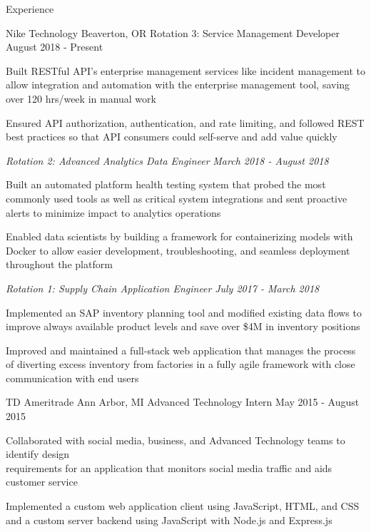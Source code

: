 \documentclass{resume}
\begin{document}
\begin{rSection}{Experience}

\begin{rSubsection}{Nike Technology}
                   {Beaverton, OR}
                   {Rotation 3: Service Management Developer}
                   {August 2018 - Present}
    \item Built RESTful API's enterprise management services like incident management
          to allow integration and automation with the enterprise management tool, saving
          over 120 hrs/week in manual work
    \item Ensured API authorization, authentication, and rate limiting, and followed REST best practices
          so that API consumers could self-serve and add value quickly

    \vspace{-1mm}
    {\em Rotation 2: Advanced Analytics Data Engineer} \hfill {\em March 2018 -  August 2018}
    \item Built an automated platform health testing system that probed the most
          commonly used tools as well as critical system integrations and sent
          proactive alerts to minimize impact to analytics operations
    \item Enabled data scientists by building a framework for containerizing models
          with Docker to allow easier development, troubleshooting, and seamless deployment
          throughout the platform

    \vspace{-1mm}
    {\em Rotation 1: Supply Chain Application Engineer} \hfill {\em July 2017 - March 2018}
    \item Implemented an SAP inventory planning tool and modified existing data flows
          to improve always available product levels and save over \$4M in inventory positions
    \item Improved and maintained a full-stack web application that manages the process of
          diverting excess inventory from factories in a fully agile framework with close
          communication with end users
\end{rSubsection}


\begin{rSubsection}{TD Ameritrade}
                   {Ann Arbor, MI}
                   {Advanced Technology Intern}
                   {May 2015 - August 2015}
    \item Collaborated with social media, business, and Advanced Technology
          teams to identify design \\ requirements for an application that
          monitors social media traffic and aids customer service
    \item Implemented a custom web application client using JavaScript, HTML,
          and CSS and a custom server backend using JavaScript with Node.js and
          Express.js
\end{rSubsection}


\end{rSection}
\end{document}
